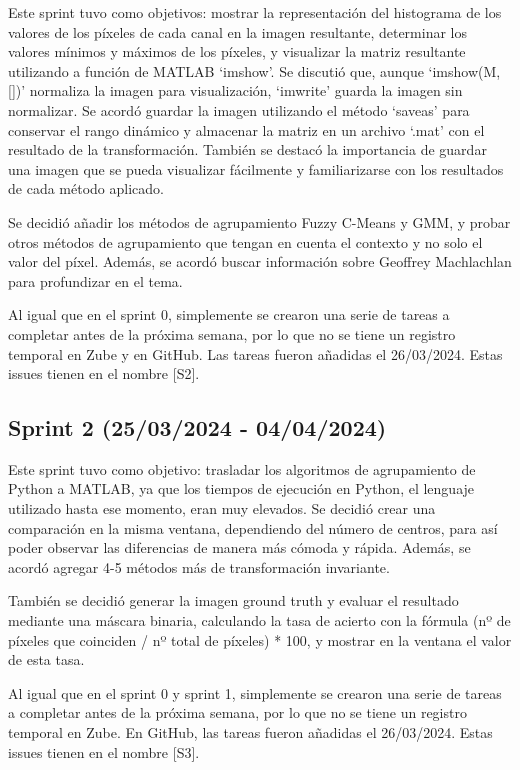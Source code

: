 Este sprint tuvo como objetivos: mostrar la representación del histograma de los valores de los píxeles de cada canal en la imagen resultante, determinar los valores mínimos y máximos de los píxeles, y visualizar la matriz resultante utilizando a función de MATLAB `imshow'. Se discutió que, aunque `imshow(M, [])' normaliza la imagen para visualización, `imwrite' guarda la imagen sin normalizar. Se acordó guardar la imagen utilizando el método `saveas' para conservar el rango dinámico y almacenar la matriz en un archivo `.mat' con el resultado de la transformación. También se destacó la importancia de guardar una imagen que se pueda visualizar fácilmente y familiarizarse con los resultados de cada método aplicado.

Se decidió añadir los métodos de agrupamiento Fuzzy C-Means y GMM, y probar otros métodos de agrupamiento que tengan en cuenta el contexto y no solo el valor del píxel. Además, se acordó buscar información sobre Geoffrey Machlachlan para profundizar en el tema.

Al igual que en el sprint 0, simplemente se crearon una serie de tareas a completar antes de la próxima semana, por lo que no se tiene un registro temporal en Zube y en GitHub. Las tareas fueron añadidas el 26/03/2024. Estas issues tienen en el nombre [S2].

\subsection{Sprint 2 (25/03/2024 - 04/04/2024)}\label{sprint-2}

Este sprint tuvo como objetivo: trasladar los algoritmos de agrupamiento de Python a MATLAB, ya que los tiempos de ejecución en Python, el lenguaje utilizado hasta ese momento, eran muy elevados. Se decidió crear una comparación en la misma ventana, dependiendo del número de centros, para así poder observar las diferencias de manera más cómoda y rápida. Además, se acordó agregar 4-5 métodos más de transformación invariante.

También se decidió generar la imagen ground truth y evaluar el resultado mediante una máscara binaria, calculando la tasa de acierto con la fórmula  (nº de píxeles que coinciden / nº total de píxeles) * 100, y mostrar en la ventana el valor de esta tasa.

Al igual que en el sprint 0 y sprint 1, simplemente se crearon una serie de tareas a completar antes de la próxima semana, por lo que no se tiene un registro temporal en Zube. En GitHub, las tareas fueron añadidas el 26/03/2024. Estas issues tienen en el nombre [S3].

